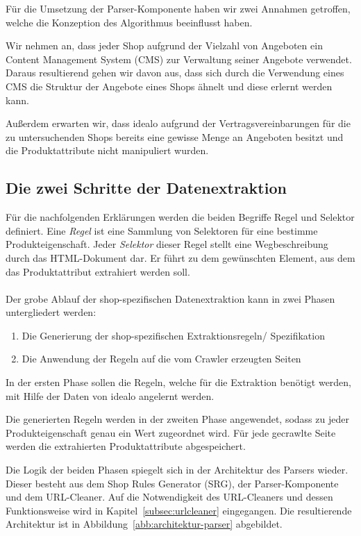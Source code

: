 Für die Umsetzung der Parser-Komponente haben wir zwei Annahmen getroffen, welche die Konzeption des Algorithmus
beeinflusst haben.

Wir nehmen an, dass jeder Shop aufgrund der Vielzahl von Angeboten ein Content Management System (CMS) zur Verwaltung
seiner Angebote verwendet.
Daraus resultierend gehen wir davon aus, dass sich durch die Verwendung eines CMS die Struktur der Angebote eines Shops
ähnelt und diese erlernt werden kann.

Außerdem erwarten wir, dass idealo aufgrund der Vertragsvereinbarungen für die zu untersuchenden Shops bereits
eine gewisse Menge an Angeboten besitzt und die Produktattribute nicht manipuliert wurden.

\subsection{Die zwei Schritte der Datenextraktion}
\label{subsec:grundidee}

Für die nachfolgenden Erklärungen werden die beiden Begriffe Regel und Selektor definiert.
Eine \textit{Regel} ist eine Sammlung von Selektoren für eine bestimme Produkteigenschaft.
Jeder \textit{Selektor} dieser Regel stellt eine Wegbeschreibung durch das HTML-Dokument dar.
Er führt zu dem gewünschten Element, aus dem das Produktattribut extrahiert werden soll.
\\
~\\
Der grobe Ablauf der shop-spezifischen Datenextraktion kann in zwei Phasen untergliedert werden:
\begin{enumerate}
    \item Die Generierung der shop-spezifischen Extraktionsregeln/ Spezifikation
    \item Die Anwendung der Regeln auf die vom Crawler erzeugten Seiten
\end{enumerate}

In der ersten Phase sollen die Regeln, welche für die Extraktion benötigt werden, mit Hilfe der Daten von idealo
angelernt werden.

Die generierten Regeln werden in der zweiten Phase angewendet, sodass zu jeder Produkteigenschaft genau ein Wert
zugeordnet wird.
Für jede gecrawlte Seite werden die extrahierten Produktattribute abgespeichert.

Die Logik der beiden Phasen spiegelt sich in der Architektur des Parsers wieder.
Dieser besteht aus dem Shop Rules Generator (SRG), der Parser-Komponente und dem URL-Cleaner.
Auf die Notwendigkeit des URL-Cleaners und dessen Funktionsweise wird in Kapitel~\ref{subsec:urlcleaner} eingegangen.
Die resultierende Architektur ist in Abbildung~\ref{abb:architektur-parser} abgebildet.

